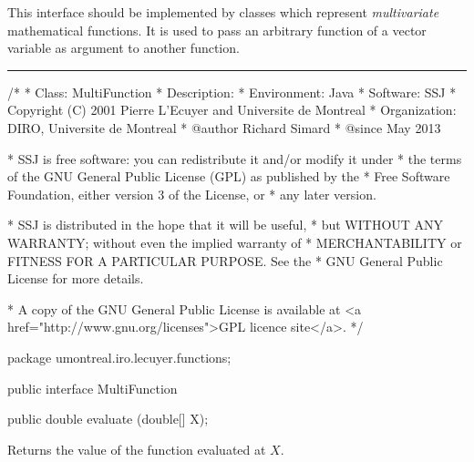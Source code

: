 
This interface should be implemented by classes which represent \emph{multivariate}
mathematical functions. It is used to pass an arbitrary function of a vector
variable as argument to another function.

\bigskip\hrule\bigskip

\begin{code}\begin{hide}
/*
 * Class:        MultiFunction
 * Description:
 * Environment:  Java
 * Software:     SSJ
 * Copyright (C) 2001  Pierre L'Ecuyer and Universite de Montreal
 * Organization: DIRO, Universite de Montreal
 * @author       Richard Simard
 * @since        May 2013

 * SSJ is free software: you can redistribute it and/or modify it under
 * the terms of the GNU General Public License (GPL) as published by the
 * Free Software Foundation, either version 3 of the License, or
 * any later version.

 * SSJ is distributed in the hope that it will be useful,
 * but WITHOUT ANY WARRANTY; without even the implied warranty of
 * MERCHANTABILITY or FITNESS FOR A PARTICULAR PURPOSE.  See the
 * GNU General Public License for more details.

 * A copy of the GNU General Public License is available at
   <a href="http://www.gnu.org/licenses">GPL licence site</a>.
 */
\end{hide}
package umontreal.iro.lecuyer.functions;


public interface MultiFunction\begin{hide} {\end{hide}
\end{code}
\begin{code}

   public double evaluate (double[] X);
\end{code}
\begin{tabb}
   Returns the value of the function evaluated at $X$.
\end{tabb}
\begin{htmlonly}
\end{htmlonly}
\begin{code}\begin{hide}
}\end{hide}
\end{code}
